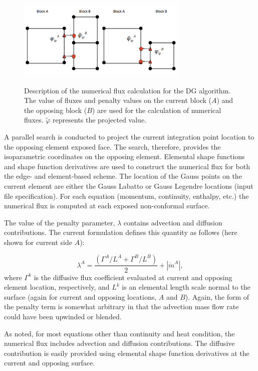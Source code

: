 \begin{figure}
\centering
  {\includegraphics[height=1.5in]{images/contactSearchAndEval.pdf}}
  \vspace{0.25in}
  \caption{Description of the numerical flux calculation for the DG algorithm. The 
    value of fluxes and penalty values on the current block ($A$) and the opposing block ($B$) are used 
    for the calculation of numerical fluxes. $\tilde \varphi$ represents the projected value.}
  \label{nonConformal}
\end{figure}

A parallel search is conducted to project the current integration point location to the opposing element exposed face. 
The search, therefore, provides the isoparametric coordinates on the opposing element. Elemental shape functions 
and shape function derivatives are used to construct the numerical flux for both the edge- and element-based 
scheme. The location of the Gauss points on the current element are either the Gauss Labatto or Gauss Legendre 
locations (input file specification). For each equation (momentum, continuity, enthalpy, etc.) the numerical 
flux is computed at each exposed non-conformal surface.

The value of the penalty parameter, $\lambda$ contains advection and diffusion contributions. The current 
formulation defines this quantity as follows (here shown for current side $A$):

\begin{equation} 
        \lambda^A = \frac{(\Gamma^A / L^A + \Gamma^B / L^B )}{2} + |\dot{m}^A|,
\label{lamdbaA}
\end{equation}
where $\Gamma^k$ is the diffusive flux coefficient evaluated at current and opposing element location, respectively, 
and $L^k$ is an elemental length scale normal to the surface (again for current and opposing locations, $A$ and $B$). 
Again, the form of the penalty term is somewhat arbitrary in that the advection mass flow rate could have been upwinded 
or blended.

As noted, for most equations other than continuity and heat condition, the numerical flux includes advection and 
diffusion contributions. The diffusive contribution is easily provided using elemental shape function derivatives 
at the current and opposing surface. 

